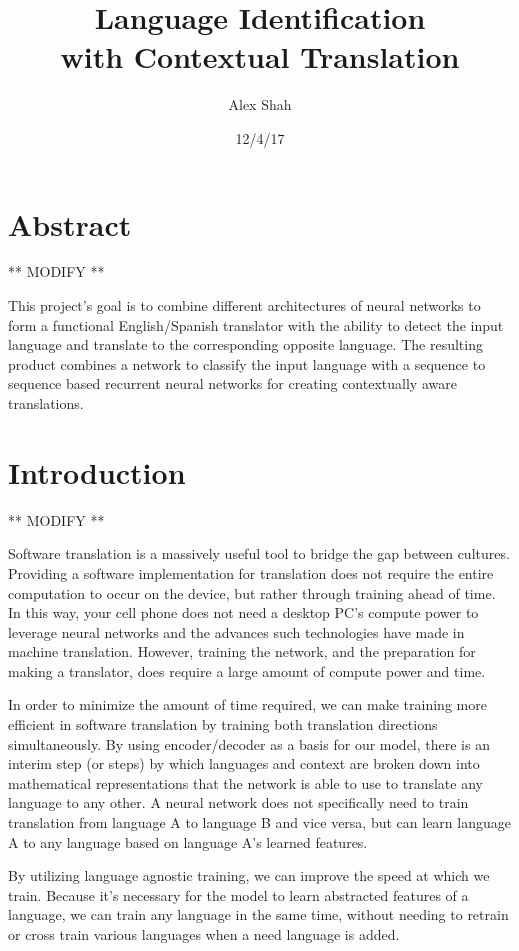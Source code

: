 \documentclass[10pt,a4paper]{article}
\begin{document}
\title{Language Identification \\ with Contextual Translation}
\author{Alex Shah}
\date{12/4/17}

\maketitle

\section{Abstract}
** MODIFY **

   This project's goal is to combine different architectures of neural networks to form a functional English/Spanish translator with the ability to detect the input language and translate to the corresponding opposite language. The resulting product combines a network to classify the input language with a sequence to sequence based recurrent neural networks for creating contextually aware translations.

\section{Introduction}
** MODIFY **

  Software translation is a massively useful tool to bridge the gap between cultures. Providing a software implementation for translation does not require the entire computation to occur on the device, but rather through training ahead of time. In this way, your cell phone does not need a desktop PC's compute power to leverage neural networks and the advances such technologies have made in machine translation. However, training the network, and the preparation for making a translator, does require a large amount of compute power and time.

  In order to minimize the amount of time required, we can make training more efficient in software translation by training both translation directions simultaneously. By using encoder/decoder as a basis for our model, there is an interim step (or steps) by which languages and context are broken down into mathematical representations that the network is able to use to translate any language to any other. A neural network does not specifically need to train translation from language A to language B and vice versa, but can learn language A to any language based on language A's learned features. 

  By utilizing language agnostic training, we can improve the speed at which we train. Because it's necessary for the model to learn abstracted features of a language, we can train any language in the same time, without needing to retrain or cross train various languages when a need language is added.
\end{document}
